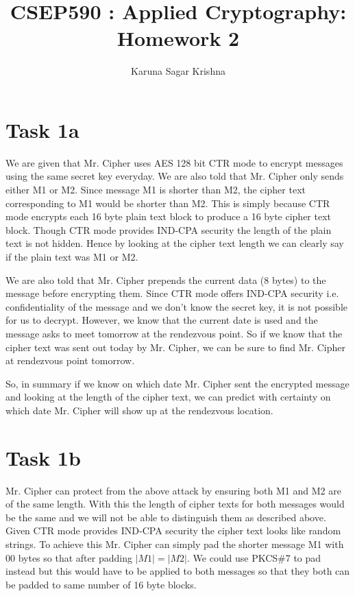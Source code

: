 \documentclass{article}
\title{CSEP590 : Applied Cryptography: Homework 2}
\author{Karuna Sagar Krishna}
\begin{document}
    \maketitle

    \section*{Task 1a}
    We are given that Mr. Cipher uses AES 128 bit CTR mode to encrypt messages using the same secret key everyday. We are also told that Mr. Cipher only sends either M1 or M2. Since message M1 is shorter than M2, the cipher text corresponding to M1 would be shorter than M2. This is simply because CTR mode encrypts each 16 byte plain text block to produce a 16 byte cipher text block. Though CTR mode provides IND-CPA security the length of the plain text is not hidden. Hence by looking at the cipher text length we can clearly say if the plain text was M1 or M2.
    
    We are also told that Mr. Cipher prepends the current data (8 bytes) to the message before encrypting them. Since CTR mode offers IND-CPA security i.e. confidentiality of the message and we don't know the secret key, it is not possible for us to decrypt. However, we know that the current date is used and the message asks to meet tomorrow at the rendezvous point. So if we know that the cipher text was sent out today by Mr. Cipher, we can be sure to find Mr. Cipher at rendezvous point tomorrow.
    
    So, in summary if we know on which date Mr. Cipher sent the encrypted message and looking at the length of the cipher text, we can predict with certainty on which date Mr. Cipher will show up at the rendezvous location.

    \section*{Task 1b}
    Mr. Cipher can protect from the above attack by ensuring both M1 and M2 are of the same length. With this the length of cipher texts for both messages would be the same and we will not be able to distinguish them as described above. Given CTR mode provides IND-CPA security the cipher text looks like random strings. To achieve this Mr. Cipher can simply pad the shorter message M1 with $00$ bytes so that after padding $|M1| = |M2|$. We could use PKCS\#7 to pad instead but this would have to be applied to both messages so that they both can be padded to same number of 16 byte blocks.
    
\end{document}
